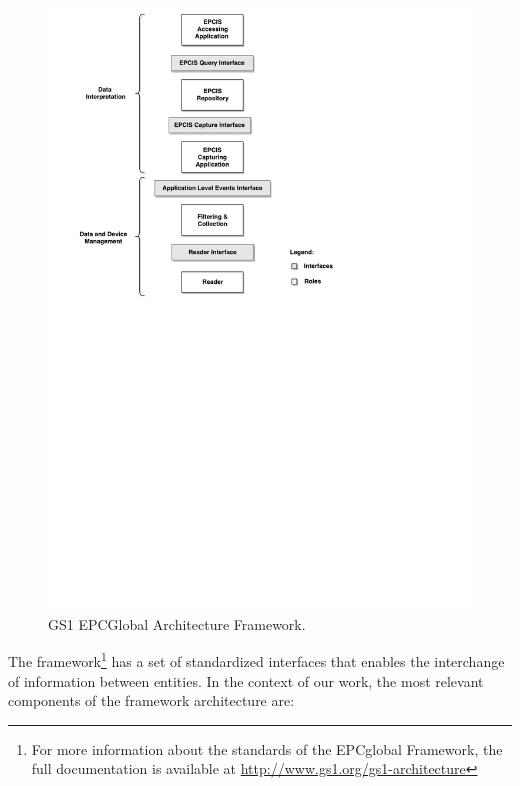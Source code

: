 \begin{figure}[ht!]
  \centering
  \includegraphics[width=.8\textwidth]{./images/EPCGlobal_architecture}
  \caption[EPCGlobal Architecture Framework.]{GS1 EPCGlobal Architecture Framework.}
  \label{fig:epc_architecture}
\end{figure}

The framework\footnote{For more information about the standards of the EPCglobal Framework, the
full documentation is available at \url{http://www.gs1.org/gs1-architecture}} has a
set of standardized interfaces that enables the interchange of information between entities. In the
context of our work, the most relevant components of the framework architecture are:

